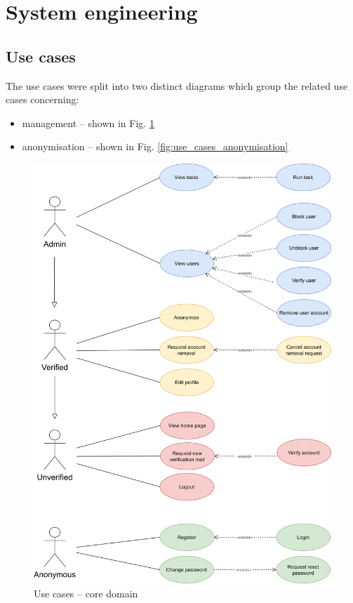 \documentclass[a4paper,twoside,12pt]{book}
\begin{document}
\section{System engineering}
\subsection{Use cases}

The use cases were split into two distinct diagrams which group the related use cases concerning:
\begin{itemize}
\item management – shown in Fig. \ref{fig:use_cases_management}
\item anonymisation – shown in Fig. \ref{fig:use_cases_anonymisation} 
\end{itemize}

\begin{figure}
  \centering
  \includegraphics[width=\linewidth]{img/use_cases_core.png}
  \caption{Use cases – core domain}
  \label{fig:use_cases_management}
\end{figure}
\end{document}

